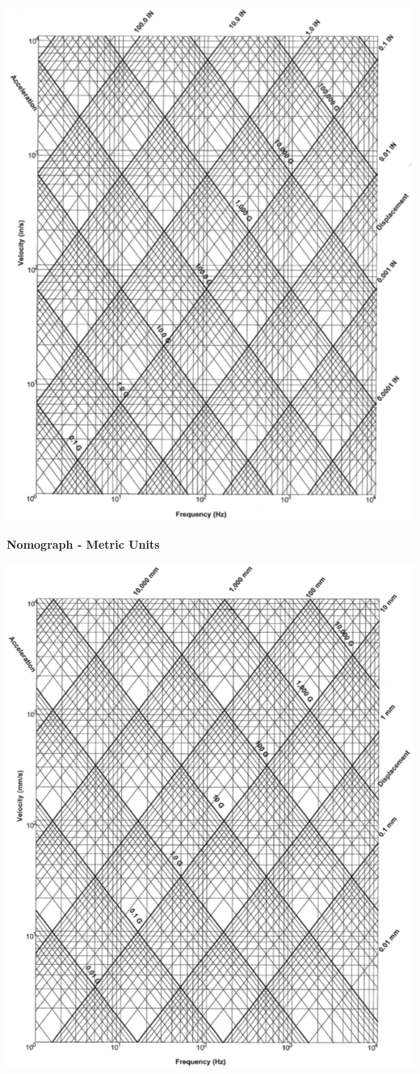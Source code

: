 \documentclass[
]{book}
\begin{document}
\includegraphics{media/08/image109.png}

\textbf{Nomograph - Metric Units}

\includegraphics{media/08/image110.png}
\end{document}
